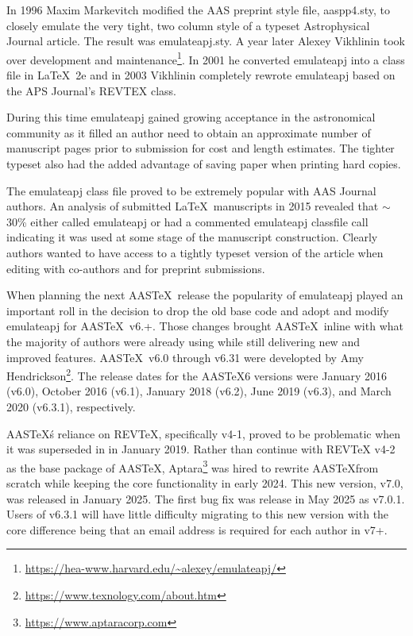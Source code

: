 \documentclass[linenumbers,trackchanges]{aastex701}
\newcommand\aastex{AAS\TeX}
\newcommand\latex{La\TeX}
\begin{document}
In 1996 Maxim Markevitch modified the AAS preprint style file, aaspp4.sty,
to closely emulate the very tight, two column style of a typeset
Astrophysical Journal article.  The result was emulateapj.sty. A year
later Alexey Vikhlinin took over development and maintenance\footnote{\url{https://hea-www.harvard.edu/~alexey/emulateapj/}}. In 2001 he
converted emulateapj into a class file in \latex\ 2e and in 2003 Vikhlinin
completely rewrote emulateapj based on the APS Journal's REVTEX class.

During this time emulateapj gained growing acceptance in the astronomical
community as it filled an author need to obtain an approximate number of
manuscript pages prior to submission for cost and length estimates. The
tighter typeset also had the added advantage of saving paper when printing 
hard copies.

The emulateapj class file proved to be extremely popular with AAS Journal authors.  An 
analysis of submitted \latex\ manuscripts in 2015 revealed that $\sim$30\%
either called emulateapj or had a commented emulateapj classfile call
indicating it was used at some stage of the manuscript construction.
Clearly authors wanted to have access to a tightly typeset version of the
article when editing with co-authors and for preprint submissions.

When planning the next \aastex\ release the popularity of emulateapj played
an important roll in the decision to drop the old base code and adopt and
modify emulateapj for \aastex\ v6.+.  Those changes brought \aastex\
inline with what the majority of authors were already using while still
delivering new and improved features.  \aastex\ v6.0 through v6.31 were
developted by Amy Hendrickson\footnote{\url{https://www.texnology.com/about.htm}}.
The release dates for the \aastex 6 versions were January 2016 (v6.0),
October 2016 (v6.1), January 2018 (v6.2), June 2019 (v6.3), and March 2020
(v6.3.1), respectively.

\aastex\'s reliance on REVTeX, specifically v4-1, proved to be problematic when it was superseded in in January 2019. Rather than continue with REVTeX v4-2 as the base package of \aastex, Aptara\footnote{\url{https://www.aptaracorp.com}} was hired to rewrite \aastex from scratch while keeping the core functionality in early 2024. This new version, v7.0, was released in January 2025. The first bug fix was release in May 2025 as v7.0.1. Users of v6.3.1 will have little difficulty migrating to this new version with the core difference being that an email address is required for each author in v7+.
\end{document}
